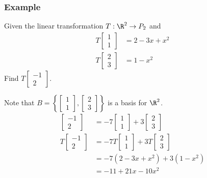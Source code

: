 \documentclass{math}
\begin{document}
\subsubsection*{Example}
Given the linear transformation \( T:\R^2\to P_2 \) and
\begin{align*}
  T\begin{bmatrix}1 \\ 1\end{bmatrix} &= 2-3x+x^2 \\
  T\begin{bmatrix}2 \\ 3\end{bmatrix} &= 1-x^2
\end{align*}
Find \( T\begin{bmatrix}-1 \\ 2\end{bmatrix} \). \par
Note that \( B = \left\{\begin{bmatrix}1 \\ 1\end{bmatrix}, \begin{bmatrix}2 \\
3 \end{bmatrix}\right\} \) is a basis for \( \R^2 \).
\begin{align*}
  \begin{bmatrix}-1 \\ 2\end{bmatrix} &=
    -7\begin{bmatrix}1 \\ 1\end{bmatrix}+
    3\begin{bmatrix}2 \\ 3\end{bmatrix} \\
  T\begin{bmatrix}-1 \\ 2\end{bmatrix} &=
    -7T\begin{bmatrix}1 \\ 1\end{bmatrix}+
    3T\begin{bmatrix}2 \\ 3\end{bmatrix} \\
  &= -7(2-3x+x^2)+3(1-x^2) \\
  &= -11+21x-10x^2
\end{align*}
\end{document}
